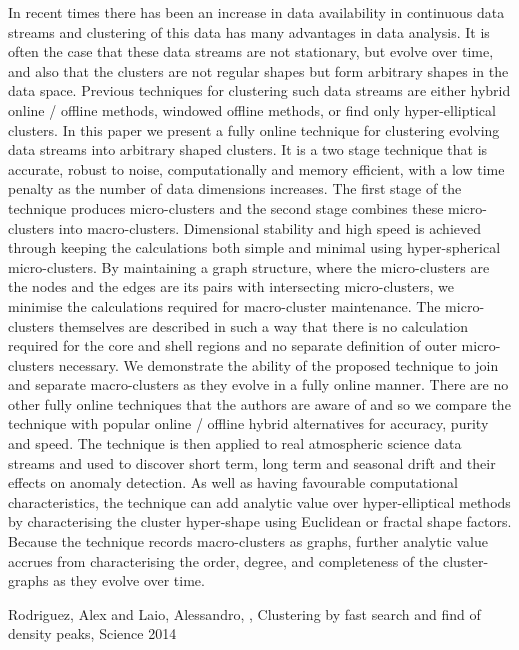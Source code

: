 {In recent times there has been an increase in data availability in continuous data streams and clustering of this data has many advantages in data analysis. It is often the case that these data streams are not stationary, but evolve over time, and also that the clusters are not regular shapes but form arbitrary shapes in the data space. Previous techniques for clustering such data streams are either hybrid online / offline methods, windowed offline methods, or find only hyper-elliptical clusters. In this paper we present a fully online technique for clustering evolving data streams into arbitrary shaped clusters. It is a two stage technique that is accurate, robust to noise, computationally and memory efficient, with a low time penalty as the number of data dimensions increases. The first stage of the technique produces micro-clusters and the second stage combines these micro-clusters into macro-clusters. Dimensional stability and high speed is achieved through keeping the calculations both simple and minimal using hyper-spherical micro-clusters. By maintaining a graph structure, where the micro-clusters are the nodes and the edges are its pairs with intersecting micro-clusters, we minimise the calculations required for macro-cluster maintenance. The micro-clusters themselves are described in such a way that there is no calculation required for the core and shell regions and no separate definition of outer micro-clusters necessary. We demonstrate the ability of the proposed technique to join and separate macro-clusters as they evolve in a fully online manner. There are no other fully online techniques that the authors are aware of and so we compare the technique with popular online / offline hybrid alternatives for accuracy, purity and speed. The technique is then applied to real atmospheric science data streams and used to discover short term, long term and seasonal drift and their effects on anomaly detection. As well as having favourable computational characteristics, the technique can add analytic value over hyper-elliptical methods by characterising the cluster hyper-shape using Euclidean or fractal shape factors. Because the technique records macro-clusters as graphs, further analytic value accrues from characterising the order, degree, and completeness of the cluster-graphs as they evolve over time.


Rodriguez, Alex and Laio, Alessandro, \cite{RodriguezLaio2014-5691}, Clustering by fast search and find of density peaks, Science 2014 

}
